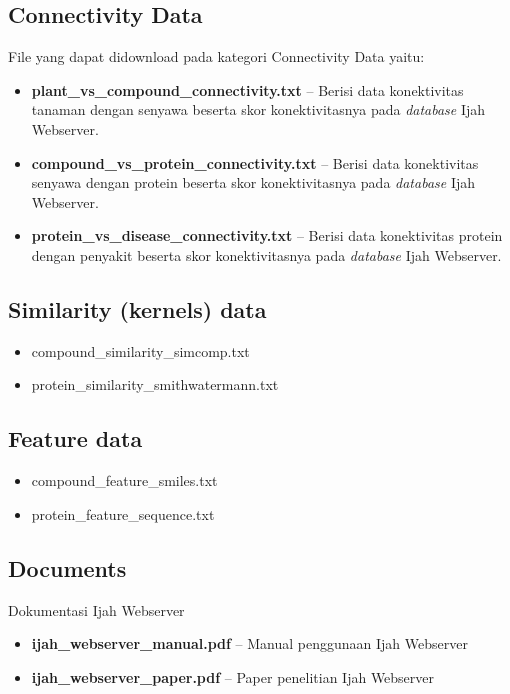 	\subsection{Connectivity Data}
	File yang dapat didownload pada kategori Connectivity Data yaitu:

	\begin{itemize}
	\item \textbf{plant\_vs\_compound\_connectivity.txt} -- Berisi data konektivitas tanaman dengan senyawa beserta skor konektivitasnya pada \emph{database} Ijah Webserver.
	\item \textbf{compound\_vs\_protein\_connectivity.txt} -- Berisi data konektivitas senyawa dengan protein beserta skor konektivitasnya pada \emph{database} Ijah Webserver.
	\item \textbf{protein\_vs\_disease\_connectivity.txt} -- Berisi data konektivitas protein dengan penyakit beserta skor konektivitasnya pada \emph{database} Ijah Webserver.
	\end{itemize}

	\subsection{Similarity (kernels) data}
	\begin{itemize}
	\item compound\_similarity\_simcomp.txt  
	\item protein\_similarity\_smithwatermann.txt  
	\end{itemize}

	\subsection{Feature data}
	\begin{itemize}
	\item compound\_feature\_smiles.txt  
	\item protein\_feature\_sequence.txt  
	\end{itemize}

	\subsection{Documents}
	Dokumentasi Ijah Webserver
	\begin{itemize}
	\item \textbf{ijah\_webserver\_manual.pdf} -- Manual penggunaan Ijah Webserver
	\item \textbf{ijah\_webserver\_paper.pdf} -- Paper penelitian Ijah Webserver
	\end{itemize}

